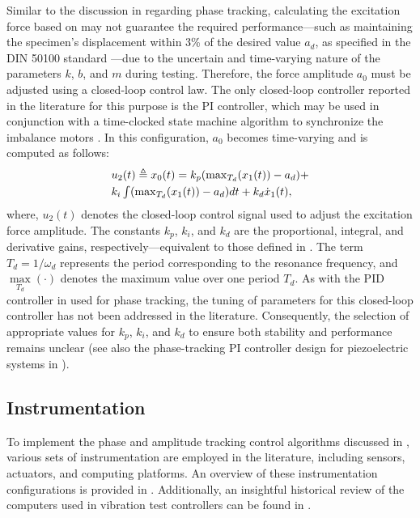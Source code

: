 \documentclass[lettersize,journal]{IEEEtran}
\begin{document}
Similar to the discussion in  regarding phase tracking, calculating the excitation force based on  may not guarantee the required performance—such as maintaining the specimen's displacement within 3\% of the desired value $a_d$, as specified in the DIN 50100 standard \cite{DIN_standard}—due to the uncertain and time-varying nature of the parameters $k$, $b$, and $m$ during testing. Therefore, the force amplitude $a_0$ must be adjusted using a closed-loop control law. The only closed-loop controller reported in the literature for this purpose is the PI controller, which may be used in conjunction with a time-clocked state machine algorithm to synchronize the imbalance motors \cite{SCHRAMM2024117045,SCHNEIDER2018171,herrmann2018simulation_Thesis}. In this configuration, $a_0$ becomes time-varying and is computed as follows:
\begin{equation}
\begin{array}{l}
u_2(t) \triangleq x_0(t)=k_{p} (\max_{T_d}(x_1(t))-a_d) + \vspace{0.1cm} \\
k_{i} \int (\max_{T_d}(x_1(t))-a_d) dt + k_d \dot{x}_1(t),
\end{array}
\label{E_PID_amplitude}
\end{equation}
where, $u_2(t)$ denotes the closed-loop control signal used to adjust the excitation force amplitude. The constants $k_p$, $k_i$, and $k_d$ are the proportional, integral, and derivative gains, respectively—equivalent to those defined in . The term $T_d = 1/\omega_d$ represents the period corresponding to the resonance frequency, and $\max\limits_{T_d}(\cdot)$ denotes the maximum value over one period $T_d$. As with the PID controller in  used for phase tracking, the tuning of parameters for this closed-loop controller has not been addressed in the literature. Consequently, the selection of appropriate values for $k_p$, $k_i$, and $k_d$ to ensure both stability and performance remains unclear (see also the phase-tracking PI controller design for piezoelectric systems in \cite{s22176378}).

\subsection{Instrumentation} \label{S_instrumentation}

To implement the phase and amplitude tracking control algorithms discussed in , various sets of instrumentation are employed in the literature, including sensors, actuators, and computing platforms. An overview of these instrumentation configurations is provided in . Additionally, an insightful historical review of the computers used in vibration test controllers can be found in \cite{Computers}.
\end{document}
